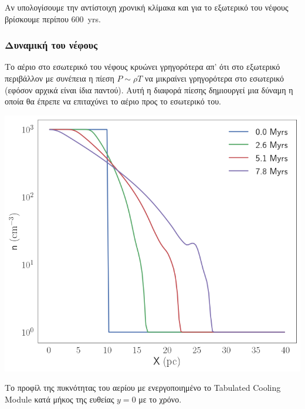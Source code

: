 	Αν υπολογίσουμε την αντίστοιχη χρονική κλίμακα και για το εξωτερικό του νέφους βρίσκουμε περίπου \SI{600}{yrs}. 
	
	

	\subsubsection{Δυναμική του νέφους}
	
	Το αέριο στο εσωτερικό του νέφους κρυώνει γρηγορότερα απ' ότι στο εξωτερικό περιβάλλον με συνέπεια η πίεση $P \sim \rho T$ να μικραίνει γρηγορότερα στο εσωτερικό (εφόσον αρχικά είναι ίδια παντού). Αυτή η διαφορά πίεσης δημιουργεί μια  δύναμη η οποία θα έπρεπε να επιταχύνει το αέριο προς το εσωτερικό του. 
	
\begin{marginfigure}
	\includegraphics[width=1\linewidth]{DataImages/TabCoolingRHOprofile}
	\caption{Το προφίλ της πυκνότητας του αερίου με ενεργοποιημένο το Tabulated Cooling Module κατά μήκος της ευθείας $y=0$ με το χρόνο.} 
	\label{fig:tabcoolingrhoprofile}
\end{marginfigure}
	

